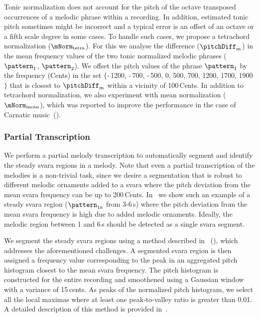 Tonic normalization does not account for the pitch of the octave transposed occurrences of a melodic phrase within a recording. In addition, estimated tonic pitch sometimes might be incorrect and a typical error is an offset of an octave or a fifth scale degree in some cases. To handle such cases, we propose a tetrachord normalization ($\mNorm_\mathrm{tetra}$). For this we analyse the difference ($\pitchDiff_m$) in the mean frequency values of the two tonic normalized melodic phrases ($\pattern_1$, $\pattern_2$). We offset the pitch values of the phrase $\pattern_1$ by the frequency (Cents) in the set $\lbrace$-\,1200, -\,700, -\,500, 0, 500, 700, 1200, 1700, 1900$\rbrace$ that is closest to $\pitchDiff_m$ within a vicinity of 100\,Cents. In addition to tetrachord normalization, we also experiment with mean normalization ($\mNorm_\mathrm{mean}$), which was reported to improve the performance in the case of Carnatic music~(). 


\subsubsection{Partial Transcription}
\label{sec:patterns_improving_similarity_partial_transcription}

We perform a partial melody transcription to automatically segment and identify the steady \gls{svara} regions in a melody. Note that even a partial transcription of the melodies is a non-trivial task, since we desire a segmentation that is robust to different melodic ornaments added to a \gls{svara} where the pitch deviation from the mean \gls{svara} frequency can be up to 200\,Cents. In~ we show such an example of a steady \gls{svara} region ($\pattern_{1a}$ from 3-6\,s) where the pitch deviation from the mean \gls{svara} frequency is high due to added melodic ornaments. Ideally, the melodic region between 1 and 6\,s should be detected as a single \gls{svara} segment.

We segment the steady \gls{svara} regions using a method described in~\cite{gulati2014Landmark} (), which addresses the aforementioned challenges. A segmented \gls{svara} region is then assigned a frequency value corresponding to the peak in an aggregated pitch histogram closest to the mean \gls{svara} frequency. The pitch histogram is constructed for the entire recording and smoothened using a Gaussian window with a variance of 15\,cents. As peaks of the normalized pitch histogram, we select all the local maximas where at least one peak-to-valley ratio is greater than 0.01. A detailed description of this method is provided in~.
 
